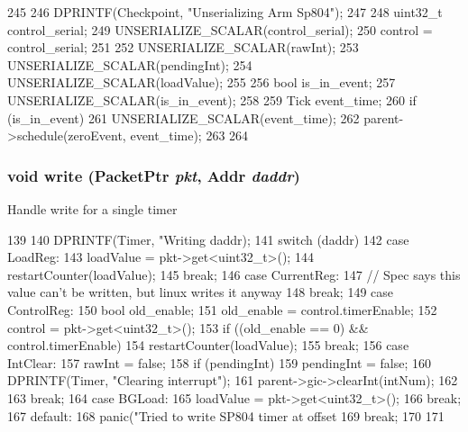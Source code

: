 \begin{DoxyCode}
245 {
246     DPRINTF(Checkpoint, "Unserializing Arm Sp804\n");
247 
248     uint32_t control_serial;
249     UNSERIALIZE_SCALAR(control_serial);
250     control = control_serial;
251 
252     UNSERIALIZE_SCALAR(rawInt);
253     UNSERIALIZE_SCALAR(pendingInt);
254     UNSERIALIZE_SCALAR(loadValue);
255 
256     bool is_in_event;
257     UNSERIALIZE_SCALAR(is_in_event);
258 
259     Tick event_time;
260     if (is_in_event){
261         UNSERIALIZE_SCALAR(event_time);
262         parent->schedule(zeroEvent, event_time);
263     }
264 }
\end{DoxyCode}
\hypertarget{classSp804_1_1Timer_a26d6a1d80de386690a8ad73932f83d96}{
\subsubsection[{write}]{\setlength{\rightskip}{0pt plus 5cm}void write ({\bf PacketPtr} {\em pkt}, \/  {\bf Addr} {\em daddr})}}
\label{classSp804_1_1Timer_a26d6a1d80de386690a8ad73932f83d96}
Handle write for a single timer 


\begin{DoxyCode}
139 {
140     DPRINTF(Timer, "Writing %
       daddr);
141     switch (daddr) {
142       case LoadReg:
143         loadValue = pkt->get<uint32_t>();
144         restartCounter(loadValue);
145         break;
146       case CurrentReg:
147         // Spec says this value can't be written, but linux writes it anyway
148         break;
149       case ControlReg:
150         bool old_enable;
151         old_enable = control.timerEnable;
152         control = pkt->get<uint32_t>();
153         if ((old_enable == 0) && control.timerEnable)
154             restartCounter(loadValue);
155         break;
156       case IntClear:
157         rawInt = false;
158         if (pendingInt) {
159             pendingInt = false;
160             DPRINTF(Timer, "Clearing interrupt\n");
161             parent->gic->clearInt(intNum);
162         }
163         break;
164       case BGLoad:
165         loadValue = pkt->get<uint32_t>();
166         break;
167       default:
168         panic("Tried to write SP804 timer at offset %
169         break;
170     }
171 }
\end{DoxyCode}


